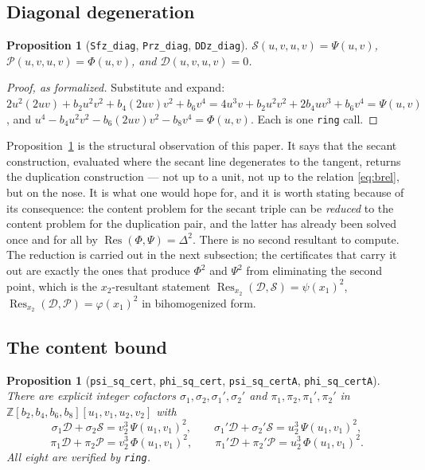 \documentclass[11pt,reqno]{amsart}
\theoremstyle{plain}
\newtheorem{proposition}[theorem]{Proposition}
\theoremstyle{definition}
\theoremstyle{remark}
\DeclareRobustCommand{\lt}[1]{\texttt{#1}}
\DeclareMathOperator{\Res}{Res}
\newcommand{\DDz}{\mathcal{D}}
\newcommand{\Sfz}{\mathcal{S}}
\newcommand{\Prz}{\mathcal{P}}
\begin{document}
\subsection{Diagonal degeneration}\label{sec:diag}

\begin{proposition}[\lt{Sfz\_diag}, \lt{Prz\_diag}, \lt{DDz\_diag}]
\label{prop:diag}
$\Sfz(u,v,u,v) = \Psi(u,v)$, $\Prz(u,v,u,v) = \Phi(u,v)$, and
$\DDz(u,v,u,v) = 0$.
\end{proposition}

\begin{proof}[Proof, as formalized]
Substitute and expand:
$2u^2(2uv) + b_2u^2v^2 + b_4(2uv)v^2 + b_6v^4
 = 4u^3v + b_2u^2v^2 + 2b_4uv^3 + b_6v^4 = \Psi(u,v)$, and
$u^4 - b_4u^2v^2 - b_6(2uv)v^2 - b_8v^4 = \Phi(u,v)$. Each is one
\lt{ring} call.
\end{proof}

Proposition~\ref{prop:diag} is the structural observation of this paper.
It says that the secant construction, evaluated where the secant line
degenerates to the tangent, returns the duplication construction --- not
up to a unit, not up to the relation \eqref{eq:brel}, but on the nose.
It is what one would hope for, and it is worth stating because of its
consequence: the content problem for the secant triple can be
\emph{reduced} to the content problem for the duplication pair, and the
latter has already been solved once and for all by
$\Res(\Phi,\Psi) = \Delta^2$. There is no second resultant to compute.
The reduction is carried out in the next subsection; the certificates
that carry it out are exactly the ones that produce
$\Phi^2$ and $\Psi^2$ from eliminating the second point, which is the
$x_2$-resultant statement $\Res_{x_2}(\DDz,\Sfz) = \psi(x_1)^2$,
$\Res_{x_2}(\DDz,\Prz) = \varphi(x_1)^2$ in bihomogenized form.

\subsection{The content bound}\label{sec:content}

\begin{proposition}[\lt{psi\_sq\_cert}, \lt{phi\_sq\_cert},
\lt{psi\_sq\_certA}, \lt{phi\_sq\_certA}]\label{prop:twin}
There are explicit integer cofactors
$\sigma_1,\sigma_2,\sigma_1',\sigma_2'$ and
$\pi_1,\pi_2,\pi_1',\pi_2'$ in
$\mathbb{Z}[b_2,b_4,b_6,b_8][u_1,v_1,u_2,v_2]$ with
\[
  \sigma_1\DDz + \sigma_2\Sfz = v_2^3\,\Psi(u_1,v_1)^2, \qquad
  \sigma_1'\DDz + \sigma_2'\Sfz = u_2^3\,\Psi(u_1,v_1)^2,
\]
\[
  \pi_1\DDz + \pi_2\Prz = v_2^3\,\Phi(u_1,v_1)^2, \qquad
  \pi_1'\DDz + \pi_2'\Prz = u_2^3\,\Phi(u_1,v_1)^2 .
\]
All eight are verified by \lt{ring}.
\end{proposition}
\end{document}
